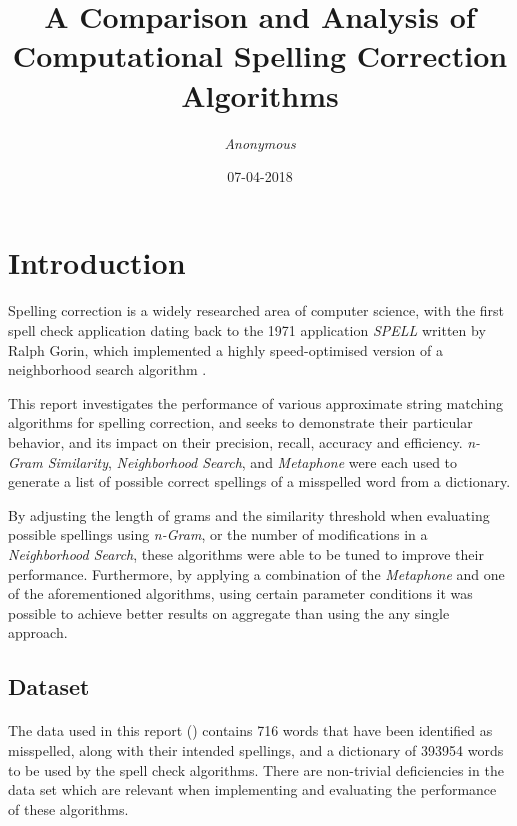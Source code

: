 \documentclass[twocolumn]{article}
\title{A Comparison and Analysis of Computational Spelling Correction Algorithms}
\author{\textit{Anonymous}}
\date{07-04-2018}
\begin{document}
    \maketitle
    \section{Introduction}
    \paragraph{}
    Spelling correction is a widely researched area of computer science, with the first spell check application dating
    back to the 1971 application \textit{SPELL} written by Ralph Gorin, which implemented a highly speed-optimised
    version of a neighborhood search algorithm\autocite[677]{HISTORY:1} .

    This report investigates the performance of various approximate string matching algorithms for spelling correction,
    and seeks to demonstrate their particular behavior, and its impact on their precision, recall, accuracy and
    efficiency. \textit{n-Gram Similarity}, \textit{Neighborhood Search}, and \textit{Metaphone} were each used to
    generate a list of possible correct spellings of a misspelled word from a dictionary.

    By adjusting the length of grams and the similarity threshold when evaluating possible spellings using \textit{n-Gram},
    or the number of modifications in a \textit{Neighborhood Search}, these algorithms were able to be tuned to improve
    their performance.
    Furthermore, by applying a combination of the \textit{Metaphone} and one of the aforementioned algorithms, using
    certain parameter conditions it was possible to achieve better results on aggregate than using the any single
    approach.
        \subsection{Dataset}\label{subsec:dataset}
        \paragraph{}
    The data used in this report (\cite{DATASET}) contains 716 words that have been identified as misspelled, along
    with their intended spellings, and a dictionary of 393954 words to be used by the spell check algorithms.
    There are non-trivial deficiencies in the data set which are relevant when implementing and evaluating the
    performance of these algorithms.
\end{document}
